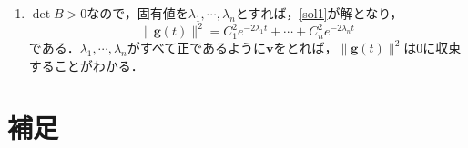 \documentclass[a4paper,pdflatex,ja=standard]{bxjsarticle}
\begin{document}
\begin{enumerate}
\begin{enumerate}
    \item 
    $\det B>0$なので，固有値を$\lambda_{1},\cdots,\lambda_{n}$とすれば，\eqref{sol1}が解となり，
    \begin{equation}
      \|\bm{g}(t)\|^2
      =
      C_{1}^2 e^{-2\lambda_{1}t}
      +
      \cdots
      +
      C_{n}^2 e^{-2\lambda_{n}t}
    \end{equation}
    である．$\lambda_{1},\cdots,\lambda_{n}$がすべて正であるように$\bm{v}$をとれば，$\|\bm{g}(t)\|^2$は$0$に収束することがわかる．

  \end{enumerate}
\end{enumerate}

\section*{補足}
\end{document}
